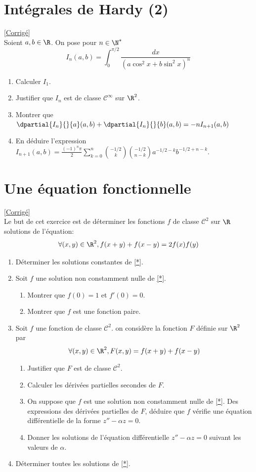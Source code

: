 \documentclass{book}
\begin{document}
\section{Intégrales de Hardy (2)}
\label{Intégrales de Hardy (2)}
\textcolor{blue}{\hyperref[Intégrales de Hardy (2) corrigé]{[Corrigé]}}\\
Soient $a,b\in \R$. On pose pour $n\in \N^*$
$$I_n(a,b)=\int_0^{\pi/2}\frac{dx}{(a\cos^2x+b\sin^2x)^n}$$
\begin{enumerate}
	\item Calculer $I_1$.
	\item Justifier que $I_n$ est de classe $\mathcal C^\infty$ sur $\R^2$.
	\item Montrer que $\dpartial{I_n}{}{a}(a,b)+\dpartial{I_n}{}{b}(a,b)=-nI_{n+1}(a,b)$
	\item En déduire l'expression $I_{n+1}(a,b)=\displaystyle\frac{(-1)^n\pi}{2}\sum_{k=0}^n\binom{-1/2}{k}\binom{-1/2}{n-k}a^{-1/2-k}b^{-1/2+n-k}$.
\end{enumerate}

\section{Une équation fonctionnelle }
\label{Une équation fonctionnelle}
\textcolor{blue}{\hyperref[Une équation fonctionnelle corrigé]{[Corrigé]}}\\
Le but de cet exercice est de déterminer les fonctions $f$ de classe $\mathcal{C}^2$ sur $\R$ solutions de l'équation: \begin{equation}
	\forall (x,y)\in\R^2, f(x+y)+f(x-y)=2f(x)f(y)
	\label{*}
\end{equation}
\begin{enumerate}
	\item Déterminer les solutions constantes de \eqref{*}.
	\item Soit $f$ une solution non constamment nulle de \eqref{*}.
	\begin{enumerate}
		\item Montrer que $f(0)=1$ et $f'(0)=0$.
		\item Montrer que $f$ est une fonction paire.
	\end{enumerate}
	\item Soit $f$ une fonction de classe $\mathcal{C}^2$. on considère la fonction $F$ définie sur $\R^2$ par $$\forall(x,y)\in\R^2, F(x,y)=f(x+y)+f(x-y)$$
	\begin{enumerate}
		\item Justifier que $F$ est de classe $\mathcal{C}^2$.
		\item Calculer les dérivées partielles secondes de $F$.
		\item On suppose que $f$ est une solution non constamment nulle de \eqref{*}. Des expressions des dérivées partielles de $F$, déduire que $f$ vérifie une équation différentielle de la forme $z''-\alpha z=0$.
		\item Donner les solutions de l'équation différentielle $z''-\alpha z=0$ suivant les valeurs de $\alpha$.
	\end{enumerate}
	\item Déterminer toutes les solutions de \eqref{*}.
\end{enumerate}
\end{document}
